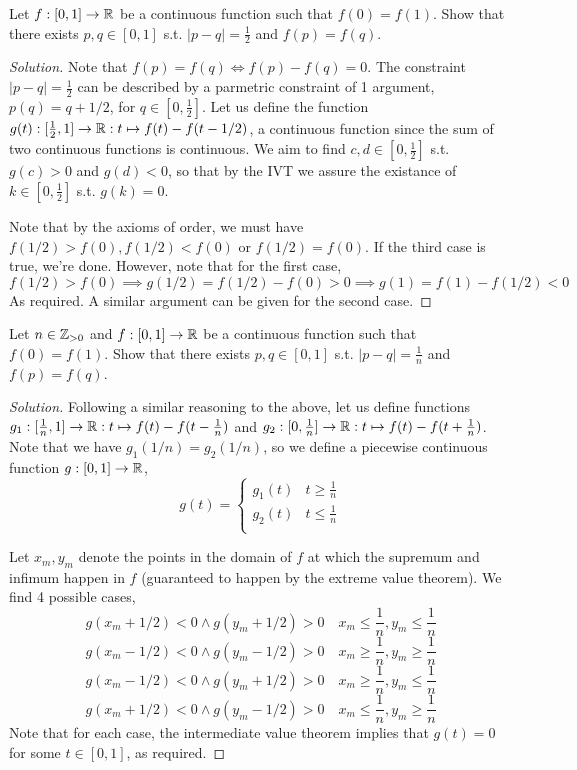 \begin{example}
  Let $f:[0,1]\to\mathbb R$ be a continuous function such that $f(0)=f(1)$. Show that there
  exists $p,q\in[0,1]$ s.t. $|p-q|=\frac{1}{2}$ and $f(p)=f(q)$.
\end{example}
\begin{proof}[Solution]
  Note that $f(p)=f(q) \iff f(p)-f(q)=0$. The constraint
  $|p-q|=\frac{1}{2}$ can be described by a parmetric constraint of 1 argument,
  $p(q)=q+1/2$, for $q\in[0,\frac{1}{2}]$. Let us define the function
  $g(t):[\frac{1}{2},1]\to\mathbb R:t\mapsto f(t)-f(t-1/2)$, a continuous function since the sum
  of two continuous functions is continuous. We aim to find $c,d\in [0,\frac{1}{2}]$ s.t.
  $g(c)>0$ and $g(d)<0$, so that by the IVT we assure the existance of
  $k\in[0,\frac{1}{2}]$ s.t. $g(k)=0$. 

  Note that by the axioms of order, we must have $f(1/2)>f(0), f(1/2)<f(0)$ or
  $f(1/2)=f(0)$. If the third case is true, we're done. However, note that for the first
  case,
  \[f(1/2)>f(0)\implies g(1/2)= f(1/2)-f(0)>0 \implies g(1)=f(1)-f(1/2)<0\] 
  As required. A similar argument can be given for the second case.
\end{proof}


\begin{example}[Generalisation]
  Let $n\in\mathbb Z_{>0}$ and $f:[0,1]\to\mathbb R$ be a continuous function such that $f(0)=f(1)$.
  Show that there exists $p,q\in[0,1]$ s.t. $|p-q|=\frac{1}{n}$ and $f(p)=f(q)$.
\end{example}
\begin{proof}[Solution]
  Following a similar reasoning to the above, let us define functions
  $g_1:[\frac{1}{n},1]\to\mathbb R:t\mapsto f(t)-f(t-\frac{1}{n})$ and
  $g_2:[0,\frac{1}{n}]\to\mathbb R:t\mapsto f(t)-f(t+\frac{1}{n})$. Note that we have
  $g_1(1/n)=g_2(1/n)$, so we define a piecewise continuous function $g:[0,1]\to\mathbb R$,
  \[
    g(t)=\begin{cases} 
      g_1(t) & t\geq \frac{1}{n} \\
      g_2(t) & t\leq \frac{1}{n} \\
    \end{cases}
  \]
  
  Let $x_m,y_m$ denote the points in the domain of $f$ at which the supremum and infimum
  happen in $f$ (guaranteed to happen by the extreme value theorem). We find 4 possible
  cases,
  \[g(x_m+1/2)<0 \land g(y_m+1/2)>0 \quad x_m\leq\frac{1}{n},y_m\leq\frac{1}{n}\]
  \[g(x_m-1/2)<0 \land g(y_m-1/2)>0 \quad x_m\geq\frac{1}{n},y_m\geq\frac{1}{n}\]
  \[g(x_m-1/2)<0 \land g(y_m+1/2)>0 \quad x_m\geq\frac{1}{n},y_m\leq\frac{1}{n}\]
  \[g(x_m+1/2)<0 \land g(y_m-1/2)>0 \quad x_m\leq\frac{1}{n},y_m\geq\frac{1}{n}\]
  Note that for each case, the intermediate value theorem implies that $g(t)=0$ for
  some $t\in [0,1]$, as required.

\end{proof}

